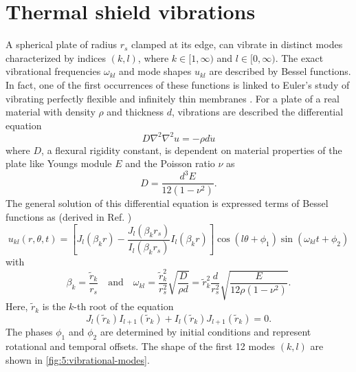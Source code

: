 \section{Thermal shield vibrations}\label{sec:5:thermal-vibrations}

A spherical plate of radius $r_s$ clamped at its edge, can vibrate in distinct modes characterized by indices $(k,l)$, where $k \in [1,\infty)$ and $l \in [0, \infty)$.
The exact vibrational frequencies $\omega_{kl}$ and mode shapes $u_{kl}$ are described by Bessel functions.
In fact, one of the first occurrences of these functions is linked to Euler's study of vibrating perfectly flexible and infinitely thin membranes \cite{Dutka_1995}.
For a plate of a real material with density $\rho$ and thickness $d$, vibrations are described the differential equation \cite[p. 490]{Rao_2019}
\begin{equation}
  D \nabla^2\nabla^2 u = -\rho d \ddot{u}
\end{equation} 
where $D$, a flexural rigidity constant, is dependent on material properties of the plate like Youngs module $E$ and the Poisson ratio $\nu$ as
\begin{equation}
  D = \frac{d^3 E}{12(1-\nu^2)} .
\end{equation}
The general solution of this differential equation is expressed terms of Bessel functions as (derived in Ref. \cite[p. 490-495]{Rao_2019}) 
\begin{equation}
  u_{kl}(r, \theta, t) = \left[J_l(\beta_k r) - \frac{J_l(\beta_k r_s)}{I_l(\beta_k r_s)}I_l(\beta_k r)\right]\cos(l\theta+\phi_1)\sin(\omega_{kl}t+\phi_2)
\end{equation}
with
\begin{equation} \label{eq:5:vibration-frequency}
  \beta_k = \frac{\tilde{r}_k}{r_s} \quad \text{and} \quad \omega_{kl} = \frac{\tilde{r}_k^2}{r_s^2}\sqrt{\frac{D}{\rho d}} = \tilde{r}_k^2\frac{d}{r_s^2}\sqrt{\frac{E}{12\rho(1-\nu^2)}} .
\end{equation}
Here, $\tilde{r}_k$ is the $k$-th root of the equation
\begin{equation}\label{eq:5:bessel-zeros}
  J_l(\tilde{r}_k)I_{l+1}(\tilde{r}_k)+I_l(\tilde{r}_k)J_{l+1}(\tilde{r}_k) = 0 .
\end{equation}
The phases $\phi_1$ and $\phi_2$ 
are determined by initial conditions and represent rotational and temporal offsets.
The shape of the first 12 modes $(k,l)$ are shown in \cref{fig:5:vibrational-modes}.
